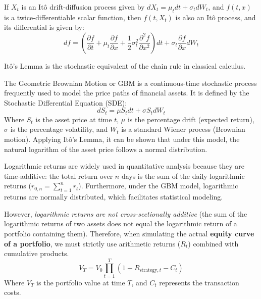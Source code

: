 \begin{proposition}
 If \(X_t\) is an Itô drift-diffusion process given by \(dX_t = \mu_t dt + \sigma_t dW_t\), and \(f(t, x)\) is a twice-differentiable scalar function, then \(f(t, X_t)\) is also an Itô process, and its differential is given by:
\[
    df = \left( \frac{\partial f}{\partial t} + \mu_t \frac{\partial f}{\partial x} + \frac{1}{2}\sigma_t^2 \frac{\partial^2 f}{\partial x^2} \right) dt + \sigma_t \frac{\partial f}{\partial x} dW_t
\]
\end{proposition}
\begin{remark}
    Itô's Lemma is the stochastic equivalent of the chain rule in classical calculus.
\end{remark}

\begin{definition}
The Geometric Brownian Motion or GBM is a continuous-time stochastic process frequently used to model the price paths of financial assets. It is defined by the Stochastic Differential Equation (SDE):
\[
    dS_t = \mu S_t dt + \sigma S_t dW_t
\]
Where \(S_t\) is the asset price at time \(t\), \(\mu\) is the percentage drift (expected return), \(\sigma\) is the percentage volatility, and \(W_t\) is a standard Wiener process (Brownian motion). Applying Itô's Lemma, it can be shown that under this model, the natural logarithm of the asset price follows a normal distribution.
\end{definition}

\begin{remark}
Logarithmic returns are widely used in quantitative analysis because they are time-additive: the total return over \(n\) days is the sum of the daily logarithmic returns (\(r_{0,n} = \sum_{t=1}^n r_t\)). Furthermore, under the GBM model, logarithmic returns are normally distributed, which facilitates statistical modeling.

However, \textit{logarithmic returns are not cross-sectionally additive} (the sum of the logarithmic returns of two assets does not equal the logarithmic return of a portfolio containing them). Therefore, when simulating the actual \textbf{equity curve of a portfolio}, we must strictly use arithmetic returns (\(R_t\)) combined with cumulative products.
\[
    V_T = V_0 \prod_{t=1}^{T} (1 + R_{\text{strategy}, t} - C_t)
\]
Where \(V_T\) is the portfolio value at time \(T\), and \(C_t\) represents the transaction costs.
\end{remark}

